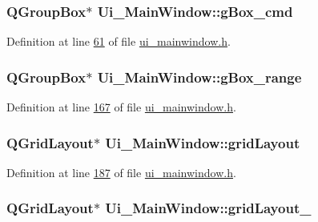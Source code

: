 \hypertarget{a00027_ad5c6667239e28060ba3b04ee0db97bac}{
\subsubsection[{g\+Box\+\_\+cmd}]{\setlength{\rightskip}{0pt plus 5cm}Q\+Group\+Box$\ast$ Ui\+\_\+\+Main\+Window\+::g\+Box\+\_\+cmd}}\label{a00027_ad5c6667239e28060ba3b04ee0db97bac}


Definition at line \hyperlink{a00052_source_l00061}{61} of file \hyperlink{a00052_source}{ui\+\_\+mainwindow.\+h}.

\hypertarget{a00027_a3c12d0504a310784c3820d1a9ad469c2}{
\subsubsection[{g\+Box\+\_\+range}]{\setlength{\rightskip}{0pt plus 5cm}Q\+Group\+Box$\ast$ Ui\+\_\+\+Main\+Window\+::g\+Box\+\_\+range}}\label{a00027_a3c12d0504a310784c3820d1a9ad469c2}


Definition at line \hyperlink{a00052_source_l00167}{167} of file \hyperlink{a00052_source}{ui\+\_\+mainwindow.\+h}.

\hypertarget{a00027_a525ed3c5fe0784ac502ee222fba4e205}{
\subsubsection[{grid\+Layout}]{\setlength{\rightskip}{0pt plus 5cm}Q\+Grid\+Layout$\ast$ Ui\+\_\+\+Main\+Window\+::grid\+Layout}}\label{a00027_a525ed3c5fe0784ac502ee222fba4e205}


Definition at line \hyperlink{a00052_source_l00187}{187} of file \hyperlink{a00052_source}{ui\+\_\+mainwindow.\+h}.

\hypertarget{a00027_a79b264e6945e3b94a511427b1c270dd7}{
\subsubsection[{grid\+Layout\+\_\+10}]{\setlength{\rightskip}{0pt plus 5cm}Q\+Grid\+Layout$\ast$ Ui\+\_\+\+Main\+Window\+::grid\+Layout\+\_}}\label{a00027_a79b264e6945e3b94a511427b1c270dd7}


